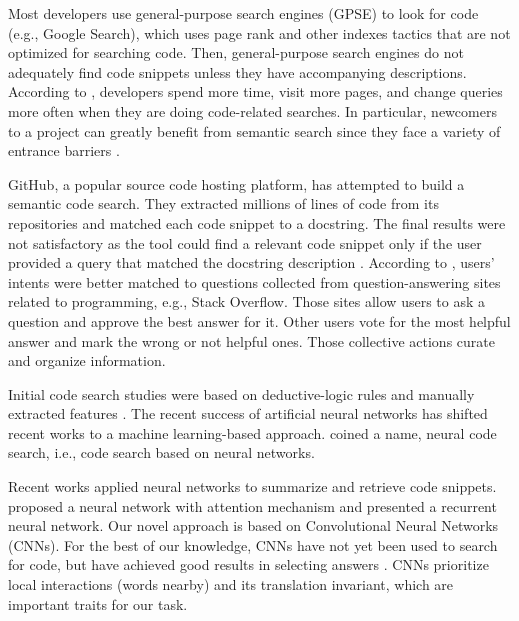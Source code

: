 \documentclass[sigconf]{acmart}
\begin{document}
Most developers use general-purpose search engines (GPSE) to look for code (e.g., Google Search), which uses page rank and other indexes tactics that are not optimized for searching code. Then, general-purpose search engines do not adequately find code snippets unless they have accompanying descriptions. According to \citet{masudur-developers-use-google-code-retrieval:2018}, developers spend more time, visit more pages, and change queries more often when they are doing code-related searches. In particular, newcomers to a project can greatly benefit from semantic search since they face a variety of entrance barriers \cite{steinmacher2015social}. 

GitHub, a popular source code hosting platform, has attempted to build a semantic code search. They extracted millions of lines of code from its repositories and matched each code snippet to a docstring. The final results were not satisfactory as the tool could find a relevant code snippet only if the user provided a query that matched the docstring description \citep{husain-github-semantic-search-code-2019}. According to \citet{cambronero-deep-code-search-2019}, users' intents were better matched to questions collected from question-answering sites related to programming, e.g., Stack Overflow. Those sites allow users to ask a question and approve the best answer for it. Other users vote for the most helpful answer and mark the wrong or not helpful ones. Those collective actions curate and organize information.

Initial code search studies were based on deductive-logic rules and manually extracted features \cite{Allamanis:2018:SML}. The recent success of artificial neural networks has shifted recent works to a machine learning-based approach. \citet{cambronero-deep-code-search-2019} coined a name, neural code search, i.e., code search based on neural networks.

Recent works applied neural networks to summarize and retrieve code snippets. \citet{cambronero-deep-code-search-2019} proposed a neural network with attention mechanism and \citet{Gu-deep-code-search:2018} presented a recurrent neural network. Our novel approach is based on Convolutional Neural Networks (CNNs). For the best of our knowledge, CNNs have not yet been used to search for code, but have achieved good results in selecting answers \citep{feng-2015, wen-joint-modeling-question-answer-2019}. CNNs prioritize local interactions (words nearby) and its translation invariant, which are important traits for our task. 
\end{document}
